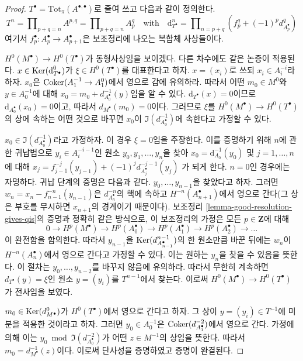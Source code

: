 \begin{proof}
$T^\bullet = \text{Tot}_\pi(A^{\bullet, \bullet})$로 줄여 쓰고 다음과
같이 정의한다.
$$
T^n = \prod\nolimits_{p + q = n} A^{p, q} =
\prod\nolimits_{p + q = n} A_p^q
\quad\text{with}\quad
\text{d}_{T^\bullet}^n =
\prod\nolimits_{n = p + q} (f_p^q + (-1)^pd_{A_p^\bullet}^q)
$$
여기서 $f_p^\bullet : A_p^\bullet \to A_{p + 1}^\bullet$은 보조정리에
나오는 복합체 사상들이다.

\medskip\noindent
$H^0(M^\bullet) \to H^0(T^\bullet)$가 동형사상임을 보이겠다. 다른
차수에도 같은 논증이 적용된다. $x \in \mathop{\mathrm{Ker}}(\text{d}_{T^\bullet}^0)$가
$\xi \in H^0(T^\bullet)$를 대표한다고 하자. $x = (x_i)$로 쓰되
$x_i \in A_i^{-i}$라 하자. $x_0$은
$\mathop{\mathrm{Coker}}(A_1^{-1} \to A_1^0)$에서 영으로 감에 유의하라. 따라서 어떤
$m_0 \in M^0$와 $y \in A_0^{-1}$에 대해
$x_0 = m_0 + d_{A_0^\bullet}^{-1}(y)$임을 알 수 있다.
$\text{d}_{T^\bullet}(x) = 0$이므로
$\text{d}_{A_0^\bullet}(x_0) = 0$이고, 따라서
$d_{M^\bullet}(m_0) = 0$이다. 그러므로 $\xi$를
$H^0(M^\bullet) \to H^0(T^\bullet)$의 상에 속하는 어떤 것으로
바꾸면 $x_0$이 $\Im(d^{-1}_{A_0^\bullet})$에 속한다고 가정할 수 있다.

\medskip\noindent
$x_0 \in \Im(d^{-1}_{A_0^\bullet})$라고 가정하자. 이 경우
$\xi = 0$임을 주장한다. 이를 증명하기 위해 $n$에 관한 귀납법으로
$y_i \in A_i^{-i - 1}$인 원소 $y_0, y_1, \ldots, y_n$을 찾아
$x_0 = \text{d}_{A_0}^{-1}(y_0)$ 및
$j = 1, \ldots, n$에 대해
$x_j = f_{j - 1}^{-j}(y_{j - 1}) + (-1)^j d^{-j - 1}_{A_j^\bullet}(y_j)$
가 되게 한다. $n = 0$인 경우에는 자명하다. 귀납 단계의 증명은
다음과 같다. $y_0, \ldots, y_{n - 1}$을 찾았다고 하자. 그러면
$w_n = x_n - f_{n - 1}^{-n}(y_{n - 1})$은
$d^{-n}_{A_n^\bullet}$의 핵에 속하고 $H^{-n}(A_{n + 1}^\bullet)$에서
영으로 간다(그 상은 부호를 무시하면 $x_{n + 1}$의 경계이기 때문이다).
보조정리 \ref{lemma-good-resolution-gives-qis}의 증명과 정확히 같은
방식으로, 이 보조정리의 가정은 모든 $p \in \mathbf{Z}$에 대해
$$
0 \to
H^p(M^\bullet) \to
H^p(A_0^\bullet) \to
H^p(A_1^\bullet) \to
H^p(A_2^\bullet) \to \ldots
$$
이 완전함을 함의한다. 따라서 $y_{n - 1}$을
$\mathop{\mathrm{Ker}}(d^{n - 1}_{A_{n - 1}^\bullet})$의 한 원소만큼 바꾼 뒤에는
$w_n$이 $H^{-n}(A_n^\bullet)$에서 영으로 간다고 가정할 수 있다.
이는 원하는 $y_n$을 찾을 수 있음을 뜻한다. 이 절차는
$y_0, \ldots, y_{n - 2}$를 바꾸지 않음에 유의하라. 따라서 무한히
계속하면 $d_{T^\bullet}(y) = \xi$인 원소
$y = (y_i)$를 $T^{n - 1}$에서 찾는다.
이로써 $H^0(M^\bullet) \to H^0(T^\bullet)$가 전사임을 보였다.

\medskip\noindent
$m_0 \in \mathop{\mathrm{Ker}}(d^0_{M^\bullet})$가 $H^0(T^\bullet)$에서 영으로 간다고
하자. 그 상이 $y = (y_i) \in T^{-1}$에 미분을 적용한 것이라고 하자.
그러면 $y_0 \in A_0^{-1}$은 $\mathop{\mathrm{Coker}}(d^{-2}_{A_1^\bullet})$에서 영으로
간다. 가정에 의해 이는
$y_0 \bmod \Im(d^{-2}_{A_0^\bullet})$가 어떤 $z \in M^{-1}$의 상임을
뜻한다. 따라서 $m_0 = d^{-1}_{M^\bullet}(z)$이다. 이로써 단사성을
증명하였고 증명이 완결된다.
\end{proof}

